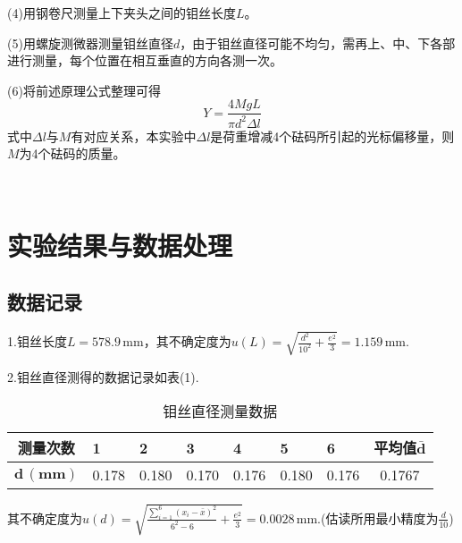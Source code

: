 \documentclass[UTF-8,twoside,cs4size]{ctexart}
\begin{document}
	(4)用钢卷尺测量上下夹头之间的钼丝长度$ L $。
	
	(5)用螺旋测微器测量钼丝直径$ d $，由于钼丝直径可能不均匀，需再上、中、下各部进行测量，每个位置在相互垂直的方向各测一次。
	
	(6)将前述原理公式整理可得
	\begin{equation}\label{1-Yang}
		Y=\frac{4MgL}{\pi d^2\Delta l}
	\end{equation}
	式中$ \Delta l $与$ M $有对应关系，本实验中$ \Delta l $是荷重增减4个砝码所引起的光标偏移量，则$ M $为4个砝码的质量。
	
	~\\
	
	\section{实验结果与数据处理}
	\subsection{数据记录}
	1.钼丝长度$ L=578.9\,\mathrm{mm} $，其不确定度为$ u(L)=\sqrt{\frac{d^2}{10^2}+\frac{e^2}{3}}=1.159\,\mathrm{mm} $.
	
	2.钼丝直径测得的数据记录如表(1).
	\begin{table}[!h]
		\centering
		\renewcommand\arraystretch{1.5}
		\begin{tabularx}{\textwidth}{|c|Y|Y|Y|Y|Y|Y|c|}
			\hline
			\textbf{测量次数}&\textbf{1}&\textbf{2}&\textbf{3}&\textbf{4}&\textbf{5}&\textbf{6}&\textbf{平均值$ \bm{\bar d} $}\\
			\hline
			$ \bm{d\,(\mathbf{mm})} $ &0.178&0.180&0.170&0.176&0.180&0.176&0.1767\\
			\hline
		\end{tabularx}
		\caption{钼丝直径测量数据}
	\end{table}

	其不确定度为$ u(d)=\sqrt{\frac{\sum_{i=1}^6(x_i-\bar x)^2}{6^2-6}+\frac{e^2}{3}}=0.0028\,\mathrm{mm} $.(估读所用最小精度为$ \frac{d}{10} $)
	
\end{document}
